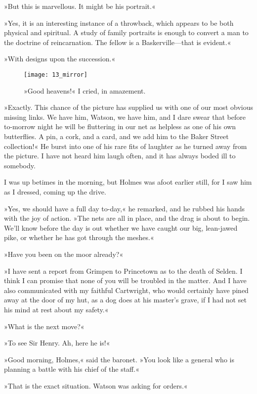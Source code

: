 »But this is marvellous. It might be his portrait.«

»Yes, it is an interesting instance of a throwback, which appears to be both physical and spiritual. A study of family portraits is enough to convert a man to the doctrine of reincarnation. The fellow is a Baskerville—that is evident.«

»With designs upon the succession.«

\begin{figure}[tbh]
\centering
\texttt{[image: 13\_mirror]}
\caption{»Good heavens!« I cried, in amazement.}
\end{figure}

»Exactly. This chance of the picture has supplied us with one of our most obvious missing links. We have him, Watson, we have him, and I dare swear that before to-morrow night he will be fluttering in our net as helpless as one of his own butterflies. A pin, a cork, and a card, and we add him to the Baker Street collection!« He burst into one of his rare fits of laughter as he turned away from the picture. I have not heard him laugh often, and it has always boded ill to somebody.

I was up betimes in the morning, but Holmes was afoot earlier still, for I saw him as I dressed, coming up the drive.

»Yes, we should have a full day to-day,« he remarked, and he rubbed his hands with the joy of action. »The nets are all in place, and the drag is about to begin. We'll know before the day is out whether we have caught our big, lean-jawed pike, or whether he has got through the meshes.«

»Have you been on the moor already?«

»I have sent a report from Grimpen to Princetown as to the death of Selden. I think I can promise that none of you will be troubled in the matter. And I have also communicated with my faithful Cartwright, who would certainly have pined away at the door of my hut, as a dog does at his master's grave, if I had not set his mind at rest about my safety.«

»What is the next move?«

»To see Sir Henry. Ah, here he is!«

»Good morning, Holmes,« said the baronet. »You look like a general who is planning a battle with his chief of the staff.«

»That is the exact situation. Watson was asking for orders.«

